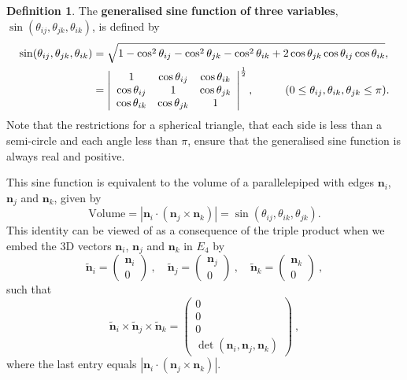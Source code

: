 \documentclass[fleqn,11pt,twoside]{article}
\theoremstyle{definition}
\newtheorem{defn}{Definition}
\begin{document}
\begin{defn}
The \textbf{generalised} \textbf{sine} \textbf{function} \textbf{of} \textbf{three} \textbf{variables}, $\sin(\theta_{ij},\theta_{jk},\theta_{ik})$, is defined by
\begin{equation}
\begin{split}
\sin(\theta_{ij},\theta_{jk},\theta_{ik})&=\sqrt{1-\cos^2\theta_{ij}-\cos^2\theta_{jk}-\cos^2\theta_{ik}+2\cos\theta_{jk}\cos\theta_{ij}\cos\theta_{ik}},\\
&=\left|\begin{array}{ccc}
1 & \cos\theta_{ij} &\cos\theta_{ik} \\
\cos\theta_{ij} & 1 & \cos\theta_{jk} \\
\cos\theta_{ik} & \cos\theta_{jk} & 1 \\
\end{array}\right|^{\frac{1}{2}}, \hspace{10mm}(0\leq\theta_{ij},\theta_{ik},\theta_{jk}\leq\pi).
\end{split}
\end{equation}
Note that the restrictions for a spherical triangle, that each side is less than a semi-circle and each angle less than $\pi$, ensure that the generalised sine function is always real and positive.
\end{defn}

This sine function is equivalent to the volume of a parallelepiped with edges $\mathbf{n}_i$, $\mathbf{n}_j$ and $\mathbf{n}_k$, given by
\begin{equation}
\text{Volume}=|\textbf{n}_i\cdot(\textbf{n}_j\times\textbf{n}_k)|=\sin(\theta_{ij},\theta_{ik},\theta_{jk}).
\end{equation}
This identity can be viewed of as a consequence of the triple product when we embed the 3D vectors $\mathbf{n}_i$, $\mathbf{n}_j$ and $\mathbf{n}_k$ in $E_4$ by
\begin{equation}
\widetilde{\mathbf{n}}_i=\left(\begin{array}{c} \mathbf{n}_i \\ 0\end{array}\right)\ , \quad  
\widetilde{\mathbf{n}}_j=\left(\begin{array}{c} \mathbf{n}_j \\ 0\end{array}\right)\ , \quad
\widetilde{\mathbf{n}}_k=\left(\begin{array}{c} \mathbf{n}_k \\ 0\end{array}\right)\ ,
\end{equation}
such that 
\begin{equation}
\widetilde{\mathbf{n}}_i\times\widetilde{\mathbf{n}}_j\times\widetilde{\mathbf{n}}_k=\left(\begin{array}{c} 0 \\ 0\\ 0 \\ \det(\mathbf{n}_i,\mathbf{n}_j,\mathbf{n}_k)\end{array}\right)\  , 
\end{equation} 
where the last entry equals $|\mathbf{n}_i\cdot(\mathbf{n}_j\times\mathbf{n}_k)|$.
\end{document}
